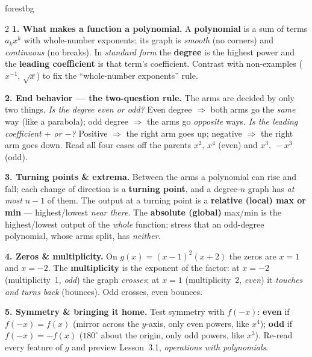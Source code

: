 \documentclass[10pt]{article}
\begin{document}
\begin{skillbox}[Lesson]{forestbg}
\begin{multicols}{2}
\textbf{1. What makes a function a polynomial.} A \textbf{polynomial} is a sum of terms $a_kx^k$
with whole-number exponents; its graph is \emph{smooth} (no corners) and \emph{continuous} (no
breaks). In \emph{standard form} the \textbf{degree} is the highest power and the \textbf{leading
coefficient} is that term's coefficient. Contrast with non-examples ($x^{-1}$, $\sqrt{x}$) to fix
the ``whole-number exponents'' rule.

\textbf{2. End behavior --- the two-question rule.} The arms are decided by only two things.
\emph{Is the degree even or odd?} Even degree $\Rightarrow$ both arms go the \emph{same} way (like a
parabola); odd degree $\Rightarrow$ the arms go \emph{opposite} ways. \emph{Is the leading
coefficient $+$ or $-$?} Positive $\Rightarrow$ the right arm goes up; negative $\Rightarrow$ the
right arm goes down. Read all four cases off the parents $x^2,\,x^4$ (even) and $x^3,\,-x^3$ (odd).

\columnbreak

\textbf{3. Turning points \& extrema.} Between the arms a polynomial can rise and fall; each
change of direction is a \textbf{turning point}, and a degree-$n$ graph has \emph{at most} $n-1$ of
them. The output at a turning point is a \textbf{relative (local) max or min} --- highest/lowest
\emph{near there}. The \textbf{absolute (global)} max/min is the highest/lowest output of the
\emph{whole} function; stress that an odd-degree polynomial, whose arms split, has \emph{neither}.

\textbf{4. Zeros \& multiplicity.} On $g(x)=(x-1)^2(x+2)$ the zeros are $x=1$ and $x=-2$. The
\textbf{multiplicity} is the exponent of the factor: at $x=-2$ (multiplicity~1, \emph{odd}) the
graph \emph{crosses}; at $x=1$ (multiplicity~2, \emph{even}) it \emph{touches and turns back}
(bounces). Odd crosses, even bounces.

\textbf{5. Symmetry \& bringing it home.} Test symmetry with $f(-x)$: \textbf{even} if
$f(-x)=f(x)$ (mirror across the $y$-axis, only even powers, like $x^4$); \textbf{odd} if
$f(-x)=-f(x)$ ($180^\circ$ about the origin, only odd powers, like $x^3$). Re-read every feature of
$g$ and preview Lesson~3.1, \emph{operations with polynomials}.
\end{multicols}
\end{skillbox}
\end{document}
